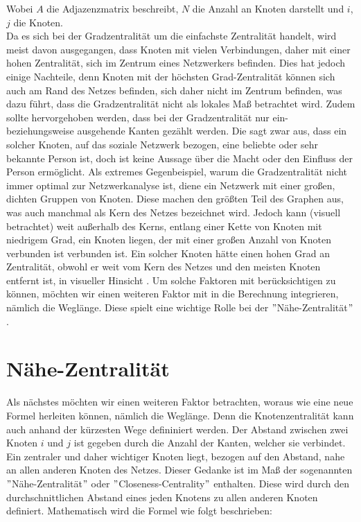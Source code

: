 Wobei $A$ die Adjazenzmatrix beschreibt, $N$ die Anzahl an Knoten darstellt und $i$, $j$ die Knoten. \\
Da es sich bei der Gradzentralität um die einfachste Zentralität handelt, wird meist davon ausgegangen, dass Knoten mit vielen Verbindungen, daher mit einer hohen Zentralität, sich im Zentrum eines Netzwerkers befinden. Dies hat jedoch einige Nachteile, denn Knoten mit der höchsten Grad-Zentralität können sich auch am Rand des Netzes befinden, sich daher nicht im Zentrum befinden, was dazu führt, dass die Gradzentralität nicht als lokales Maß betrachtet wird. Zudem sollte hervorgehoben werden, dass bei der Gradzentralität nur ein- beziehungsweise ausgehende Kanten gezählt werden. Die sagt zwar aus, dass ein solcher Knoten, auf das soziale Netzwerk bezogen, eine beliebte oder sehr bekannte Person ist, doch ist keine Aussage über die Macht oder den Einfluss der Person ermöglicht. Als extremes Gegenbeispiel, warum die Gradzentralität nicht immer optimal zur Netzwerkanalyse ist, diene ein Netzwerk mit einer großen, dichten Gruppen von Knoten. Diese machen den größten Teil des Graphen aus, was auch manchmal als Kern des Netzes bezeichnet wird. Jedoch kann (visuell betrachtet) weit außerhalb des Kerns, entlang einer Kette von Knoten mit niedrigem Grad, ein Knoten liegen, der mit einer großen Anzahl von Knoten verbunden ist
verbunden ist. Ein solcher Knoten hätte einen hohen Grad an
Zentralität, obwohl er weit vom Kern des Netzes und den meisten Knoten entfernt ist, in visueller Hinsicht \cite{SpringerElbert}. 
Um solche Faktoren mit berücksichtigen zu können, möchten wir einen weiteren Faktor mit in die Berechnung integrieren, nämlich die Weglänge. Diese spielt eine wichtige Rolle bei der $"$Nähe-Zentralität$"$.  
\section{Nähe-Zentralität}
Als nächstes möchten wir einen weiteren Faktor betrachten, woraus wie eine neue Formel herleiten können, nämlich die Weglänge. Denn die Knotenzentralität kann auch anhand der kürzesten Wege defininiert werden. Der Abstand zwischen zwei Knoten $i$ und $j$ ist gegeben durch die Anzahl der Kanten, welcher sie verbindet. Ein zentraler und daher wichtiger Knoten liegt, bezogen auf den Abstand, nahe an allen anderen Knoten des Netzes. Dieser Gedanke ist im Maß der sogenannten $"$Nähe-Zentralität$"$ oder $"$Closeness-Centrality$"$ enthalten. Diese wird durch den durchschnittlichen Abstand eines jeden Knotens zu allen anderen Knoten definiert. Mathematisch wird die Formel wie folgt beschrieben: 


